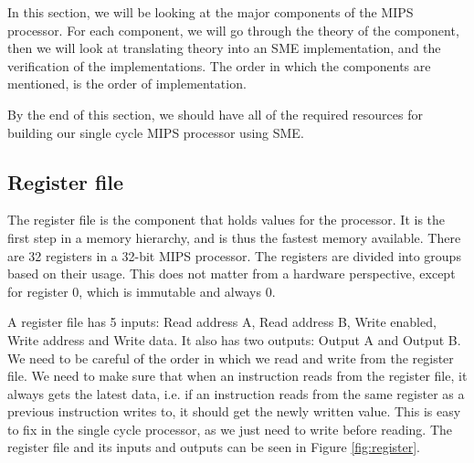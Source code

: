 In this section, we will be looking at the major components of the MIPS
processor. For each component, we will go through the theory of the component,
then we will look at translating theory into an SME implementation, and the
verification of the implementations. The order in which the components are
mentioned, is the order of implementation.

By the end of this section, we should have all of the required resources for
building our single cycle MIPS processor using SME.

\subsection{Register file}
The register file is the component that holds values for the processor. It is
the first step in a memory hierarchy, and is thus the fastest memory available.
There are 32 registers in a 32-bit MIPS processor. The registers are divided
into groups based on their usage. This does not matter from a hardware
perspective, except for register 0, which is immutable and always 0.

A register file has 5 inputs: Read address A, Read address B, Write enabled,
Write address and Write data. It also has two outputs: Output A and Output B.
We need to be careful of the order in which we read and write from the register
file. We need to make sure that when an instruction reads from the register
file, it always gets the latest data, i.e. if an instruction reads from the
same register as a previous instruction writes to, it should get the newly
written value. This is easy to fix in the single cycle processor, as we just
need to write before reading. The register file and its inputs and outputs can
be seen in Figure \ref{fig:register}.

